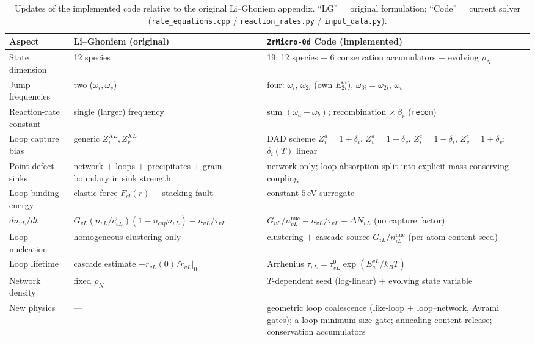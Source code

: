 \documentclass{article}
\begin{document}
\begin{table}[ht]
\centering
\caption{Updates of the implemented code relative to the original Li--Ghoniem
appendix. ``LG'' = original formulation; ``Code'' = current solver
(\texttt{rate\_equations.cpp} / \texttt{reaction\_rates.py} /
\texttt{input\_data.py}).}
\label{tab:updates}
\renewcommand{\arraystretch}{1.25}
\small
\begin{tabular}{p{} p{} p{}}
\hline
\textbf{Aspect} & \textbf{Li--Ghoniem (original)} & \textbf{\texttt{ZrMicro-0d} Code (implemented)}\\
\hline
State dimension &
12 species &
19: 12 species $+$ 6 conservation accumulators $+$ evolving $\rho_N$\\
Jump frequencies &
two ($\omega_i,\omega_v$) &
four: $\omega_i$, $\omega_{2i}$ (own $E^m_{2i}$), $\omega_{3i}=\omega_{2i}$, $\omega_v$\\
Reaction-rate constant &
single (larger) frequency &
sum $(\omega_a+\omega_b)$; recombination $\times\,\beta_r$ (\texttt{recom})\\
Loop capture bias &
generic $Z^{XL}_{i},Z^{XL}_{v}$ &
DAD scheme $Z^{a}_{i}{=}1{+}\delta_i$, $Z^{a}_{v}{=}1{-}\delta_v$, $Z^{c}_{i}{=}1{-}\delta_i$, $Z^{c}_{v}{=}1{+}\delta_v$; $\delta_i(T)$ linear\\
Point-defect sinks &
network $+$ loops $+$ precipitates $+$ grain boundary in sink strength &
network-only; loop absorption split into explicit mass-conserving coupling\\
Loop binding energy &
elastic-force $F_{el}(r)$ $+$ stacking fault &
constant $5\,$eV surrogate\\
$dn_{vL}/dt$ &
$G_{vL}(n_{vL}/c^v_{vL})(1-n_{cap}n_{vL})-n_{vL}/\tau_{vL}$ &
$G_{vL}/n^{\mathrm{nuc}}_{vL}-n_{vL}/\tau_{vL}-\Delta N_{vL}$ (no capture factor)\\
Loop nucleation &
homogeneous clustering only &
clustering $+$ cascade source $G_{iL}/n^{\mathrm{nuc}}_{iL}$ (per-atom content seed)\\
Loop lifetime &
cascade estimate $-r_{vL}(0)/\dot r_{vL}|_0$ &
Arrhenius $\tau_{vL}=\tau^0_{vL}\exp(E^{vL}_a/k_BT)$\\
Network density &
fixed $\rho_N$ &
$T$-dependent seed (log-linear) $+$ evolving state variable\\
New physics &
--- &
geometric loop coalescence (like-loop $+$ loop--network, Avrami gates); a-loop minimum-size gate; annealing content release; conservation accumulators\\
\hline
\end{tabular}
\end{table}
\end{document}
